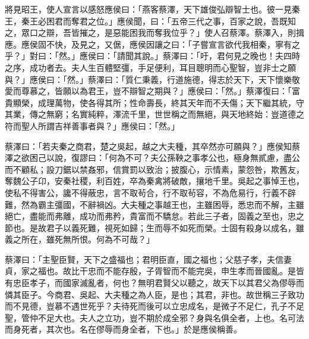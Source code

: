 \begin{pinyinscope}
將見昭王，使人宣言以感怒應侯曰：「燕客蔡澤，天下雄俊弘辯智士也。彼一見秦王，秦王必困君而奪君之位。」應侯聞，曰：「五帝三代之事，百家之說，吾既知之，眾口之辯，吾皆摧之，是惡能困我而奪我位乎？」使人召蔡澤。蔡澤入，則揖應。應侯固不快，及見之，又倨，應侯因讓之曰：「子嘗宣言欲代我相秦，寧有之乎？」對曰：「然。」應侯曰：「請聞其說。」蔡澤曰：「吁，君何見之晚也！夫四時之序，成功者去。夫人生百體堅彊，手足便利，耳目聰明而心聖智，豈非士之願與？」應侯曰：「然。」蔡澤曰：「質仁秉義，行道施德，得志於天下，天下懷樂敬愛而尊慕之，皆願以為君王，豈不辯智之期與？」應侯曰：「然。」蔡澤復曰：「富貴顯榮，成理萬物，使各得其所；性命壽長，終其天年而不夭傷；天下繼其統，守其業，傳之無窮；名實純粹，澤流千里，世世稱之而無絕，與天地終始：豈道德之符而聖人所謂吉祥善事者與？」應侯曰：「然。」

蔡澤曰：「若夫秦之商君，楚之吳起，越之大夫種，其卒然亦可願與？」應侯知蔡澤之欲困己以說，復謬曰：「何為不可？夫公孫鞅之事孝公也，極身無貳慮，盡公而不顧私；設刀鋸以禁姦邪，信賞罰以致治；披腹心，示情素，蒙怨咎，欺舊友，奪魏公子卬，安秦社稷，利百姓，卒為秦禽將破敵，攘地千里。吳起之事悼王也，使私不得害公，讒不得蔽忠，言不取茍合，行不取茍容，不為危易行，行義不辟難，然為霸主彊國，不辭禍凶。大夫種之事越王也，主雖困辱，悉忠而不解，主雖絕亡，盡能而弗離，成功而弗矜，貴富而不驕怠。若此三子者，固義之至也，忠之節也。是故君子以義死難，視死如歸；生而辱不如死而榮。士固有殺身以成名，雖義之所在，雖死無所恨。何為不可哉？」

蔡澤曰：「主聖臣賢，天下之盛福也；君明臣直，國之福也；父慈子孝，夫信妻貞，家之福也。故比干忠而不能存殷，子胥智而不能完吳，申生孝而晉國亂。是皆有忠臣孝子，而國家滅亂者，何也？無明君賢父以聽之，故天下以其君父為僇辱而憐其臣子。今商君、吳起、大夫種之為人臣，是也；其君，非也。故世稱三子致功而不見德，豈慕不遇世死乎？夫待死而後可以立忠成名，是微子不足仁，孔子不足聖，管仲不足大也。夫人之立功，豈不期於成全邪？身與名俱全者，上也。名可法而身死者，其次也。名在僇辱而身全者，下也。」於是應侯稱善。


\end{pinyinscope}
